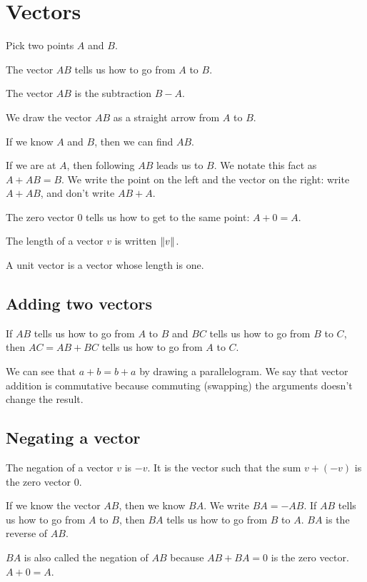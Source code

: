 \chapter{Vectors}
\label{chp:vector}
\label{sec:vector}

Pick two points \(A\) and \(B\).

The vector \(AB\) tells us how to go from \(A\) to \(B\).

The vector \(AB\) is the subtraction \( B - A \).

We draw the vector \(AB\) as a straight arrow from \(A\) to \(B\).

If we know \(A\) and \(B\), then we can find \(AB\).

If we are at \(A\), then following \(AB\) leads us to \(B\).
We notate this fact as \( A + AB = B \).
We write the point on the left and the vector on the right:
write \( A + AB \), and don't write \( AB + A \).

The zero vector \(0\) tells us how to get to the same point:
\(A + 0 = A\).

The length of a vector \(v\) is written \(\norm{v}\).

A unit vector is a vector whose length is one.

\section*{Adding two vectors}

If \(AB\) tells us how to go from \(A\) to \(B\)
and \(BC\) tells us how to go from \(B\) to \(C\),
then \(AC = AB + BC\)
tells us how to go from \(A\) to \(C\).

We can see that \( a + b = b + a \) by drawing a parallelogram.
We say that vector addition is commutative
because commuting (swapping) the arguments doesn't change the result.

\section*{Negating a vector}

The negation of a vector \(v\) is \(-v\).
It is the vector such that the sum \(v + (-v)\) is the zero vector \(0\).

If we know the vector \(AB\), then we know \(BA\).
We write \(BA = -AB\).
If \(AB\) tells us how to go from \(A\) to \(B\),
then \(BA\) tells us how to go from \(B\) to \(A\).
\(BA\) is the reverse of \(AB\).

\(BA\) is also called the negation of \(AB\) because \(AB + BA = 0\) is the zero vector.
\(A + 0 = A\).

